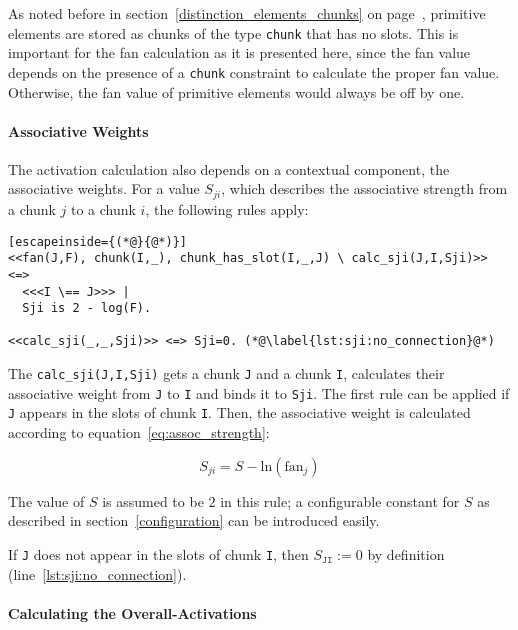 As noted before in section~\ref{distinction_elements_chunks} on page~\pageref{distinction_elements_chunks}, primitive elements are stored as chunks of the type \lstinline|chunk| that has no slots. This is important for the fan calculation as it is presented here, since the fan value depends on the presence of a \lstinline|chunk| constraint to calculate the proper fan value. Otherwise, the fan value of primitive elements would always be off by one.

\paragraph{Associative Weights}

The activation calculation also depends on a contextual component, the associative weights. For a value $S_{ji}$, which describes the associative strength from a chunk $j$ to a chunk $i$, the following rules apply:

\begin{lstlisting}[escapeinside={(*@}{@*)}]
<<fan(J,F), chunk(I,_), chunk_has_slot(I,_,J) \ calc_sji(J,I,Sji)>> <=> 
  <<<I \== J>>> | 
  Sji is 2 - log(F).

<<calc_sji(_,_,Sji)>> <=> Sji=0. (*@\label{lst:sji:no_connection}@*)
\end{lstlisting}

The \lstinline|calc_sji(J,I,Sji)| gets a chunk \lstinline|J| and a chunk \lstinline|I|, calculates their associative weight from \lstinline|J| to \lstinline|I| and binds it to \lstinline|Sji|. The first rule can be applied if \lstinline|J| appears in the slots of chunk \lstinline|I|. Then, the associative weight is calculated according to equation~\eqref{eq:assoc_strength}:

\begin{equation*}
S_{ji} = S - \mathrm{ln}(\mathrm{fan}_j) 
\end{equation*}

The value of $S$ is assumed to be $2$ in this rule; a configurable constant for $S$ as described in section~\ref{configuration} can be introduced easily.

If \lstinline|J| does not appear in the slots of chunk \lstinline|I|, then $S_{\mathtt{JI}} := 0$ by definition (line~\ref{lst:sji:no_connection}).

\paragraph{Calculating the Overall-Activations}

